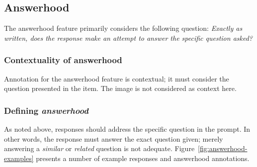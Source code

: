 \documentclass[12pt,notitlepage]{article}
\begin{document}
\subsection{Answerhood} \label{subsec:answerhood}

The answerhood feature primarily considers the following question: \textit{Exactly as written, does the response make an attempt to answer the specific question asked?}

\subsubsection{Contextuality of answerhood} Annotation for the answerhood feature is contextual; it must consider the question presented in the item. The image is not considered as context here.

\subsubsection{Defining \textit{answerhood}} As noted above, responses should address the specific question in the prompt. In other words, the response must answer the exact question given; merely answering a \textit{similar} or \textit{related} question is not adequate. Figure~\ref{fig:answerhood-examples} presents a number of example responses and answerhood annotations. 
\end{document}
